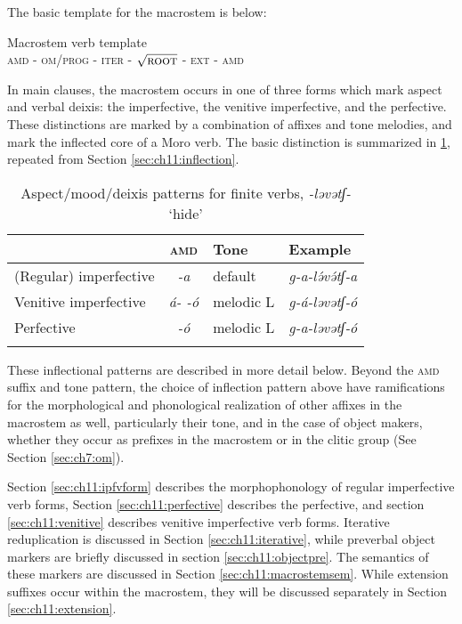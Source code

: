 The basic template for the macrostem is below:

\ea  Macrostem verb template\\ 
\textsc{amd} - \textsc{om/prog} - \textsc{iter} - $\sqrt{\textsc{root}}$ - \textsc{ext} - \textsc{amd}\\
\z 

In main clauses, the macrostem occurs in one of three forms which mark aspect and verbal deixis: the imperfective, the venitive imperfective, and the perfective. These distinctions are marked by a combination of affixes and tone melodies, and mark the inflected core of a Moro verb. The basic distinction is summarized in \ref{tab:ch11:4}, repeated from Section \ref{sec:ch11:inflection}.

\begin{table}
\begin{tabular}[t]{lcll}
\lsptoprule
						&  \textsc{amd}  		& Tone 			& Example \\
\midrule
(Regular) imperfective 	& \textit{-a} 	& default		& \textit{g-a-lə́və́tʃ-a} \\
Venitive imperfective 	& \textit{á- -ó} & melodic L 	& \textit{g-á-ləvətʃ-ó} \\	
Perfective 				& \textit{-ó} 	& melodic L 	& \textit{g-a-ləvətʃ-ó}  \\
\lspbottomrule
\end{tabular}	
\caption{Aspect/mood/deixis patterns for finite verbs, \textit{-ləvətʃ-} `hide'}
\label{tab:ch11:4}
\end{table}

These inflectional patterns are described in more detail below. Beyond the \textsc{amd} suffix and tone pattern, the choice of inflection pattern above have ramifications for the morphological and phonological realization of other affixes in the macrostem as well, particularly their tone, and in the case of object makers, whether they occur as prefixes in the macrostem or in the clitic group (See Section \ref{sec:ch7:om}).

Section \ref{sec:ch11:ipfvform} describes the morphophonology of regular imperfective verb forms, Section \ref{sec:ch11:perfective} describes the perfective, and section \ref{sec:ch11:venitive} describes venitive imperfective verb forms. Iterative reduplication is discussed in Section \ref{sec:ch11:iterative}, while preverbal object markers are briefly discussed in section \ref{sec:ch11:objectpre}. The semantics of these markers are discussed in Section \ref{sec:ch11:macrostemsem}. While extension suffixes occur within the macrostem, they will be discussed separately in Section \ref{sec:ch11:extension}. 

